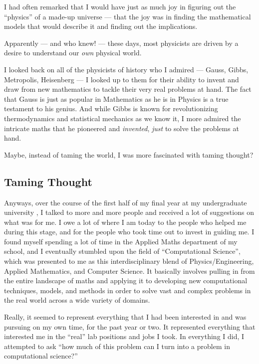 \documentclass[]{article}
\begin{document}
I had often remarked that I would have just as much joy in figuring out
the ``physics'' of a made-up universe --- that the joy was in finding
the mathematical models that would describe it and finding out the
implications.

Apparently --- and who knew! --- these days, most physicists are driven
by a desire to understand our \emph{own} physical world.

I looked back on all of the physicists of history who I admired ---
Gauss, Gibbs, Metropolis, Heisenberg --- I looked up to them for their
ability to invent and draw from new mathematics to tackle their very
real problems at hand. The fact that Gauss is just as popular in
Mathematics as he is in Physics is a true testament to his genius. And
while Gibbs is known for revolutionizing thermodynamics and statistical
mechanics as we know it, I more admired the intricate maths that he
pioneered and \emph{invented}, \emph{just} to solve the problems at
hand.

Maybe, instead of taming the world, I was more fascinated with taming
thought?

\subsection{Taming Thought}\label{taming-thought}

Anyways, over the course of the first half of my final year at my
undergraduate university , I talked to more and more people and received
a lot of suggestions on what was for me. I owe a lot of where I am today
to the people who helped me during this stage, and for the people who
took time out to invest in guiding me. I found myself spending a lot of
time in the Applied Maths department of my school, and I eventually
stumbled upon the field of ``Computational Science'', which was
presented to me as this interdisciplinary blend of Physics/Engineering,
Applied Mathematics, and Computer Science. It basically involves pulling
in from the entire landscape of maths and applying it to developing new
computational techniques, models, and methods in order to solve vast and
complex problems in the real world across a wide variety of domains.

Really, it seemed to represent everything that I had been interested in
and was pursuing on my own time, for the past year or two. It
represented everything that interested me in the ``real'' lab positions
and jobs I took. In everything I did, I attempted to ask ``how much of
this problem can I turn into a problem in computational science?''
\end{document}
